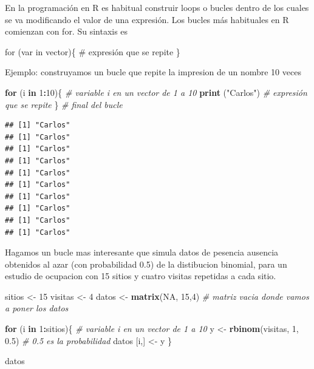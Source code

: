 \documentclass[
]{book}
\newenvironment{Shaded}{\begin{snugshade}}{\end{snugshade}}
\newcommand{\CommentTok}[1]{\textcolor[rgb]{0.56,0.35,0.01}{\textit{#1}}}
\newcommand{\ControlFlowTok}[1]{\textcolor[rgb]{0.13,0.29,0.53}{\textbf{#1}}}
\newcommand{\DecValTok}[1]{\textcolor[rgb]{0.00,0.00,0.81}{#1}}
\newcommand{\FloatTok}[1]{\textcolor[rgb]{0.00,0.00,0.81}{#1}}
\newcommand{\KeywordTok}[1]{\textcolor[rgb]{0.13,0.29,0.53}{\textbf{#1}}}
\newcommand{\NormalTok}[1]{#1}
\newcommand{\OperatorTok}[1]{\textcolor[rgb]{0.81,0.36,0.00}{\textbf{#1}}}
\newcommand{\OtherTok}[1]{\textcolor[rgb]{0.56,0.35,0.01}{#1}}
\newcommand{\StringTok}[1]{\textcolor[rgb]{0.31,0.60,0.02}{#1}}
\begin{document}
En la programación en R es habitual construir loops o bucles dentro de los cuales se va modificando el valor de una expresión. Los bucles más habituales en R comienzan con for. Su sintaxis es

for (var in vector)\{
\# expresión que se repite
\}

Ejemplo: construyamos un bucle que repite la impresion de un nombre 10 veces

\begin{Shaded}
\begin{Highlighting}[]
\ControlFlowTok{for}\NormalTok{ (i }\ControlFlowTok{in} \DecValTok{1}\OperatorTok{:}\DecValTok{10}\NormalTok{)\{     }\CommentTok{# variable i en un vector de 1 a 10}
  \KeywordTok{print}\NormalTok{ (}\StringTok{"Carlos"}\NormalTok{)   }\CommentTok{# expresión que se repite}
\NormalTok{\}                    }\CommentTok{# final del bucle}
\end{Highlighting}
\end{Shaded}

\begin{verbatim}
## [1] "Carlos"
## [1] "Carlos"
## [1] "Carlos"
## [1] "Carlos"
## [1] "Carlos"
## [1] "Carlos"
## [1] "Carlos"
## [1] "Carlos"
## [1] "Carlos"
## [1] "Carlos"
\end{verbatim}

Hagamos un bucle mas interesante que simula datos de pesencia ausencia obtenidos al azar (con probabilidad 0.5) de la distibucion binomial, para un estudio de ocupacion con 15 sitios y cuatro visitas repetidas a cada sitio.

\begin{Shaded}
\begin{Highlighting}[]
\NormalTok{sitios  <-}\StringTok{ }\DecValTok{15}
\NormalTok{visitas <-}\StringTok{ }\DecValTok{4}
\NormalTok{datos <-}\StringTok{ }\KeywordTok{matrix}\NormalTok{(}\OtherTok{NA}\NormalTok{, }\DecValTok{15}\NormalTok{,}\DecValTok{4}\NormalTok{) }\CommentTok{# matriz vacia donde vamos a poner los datos}

\ControlFlowTok{for}\NormalTok{ (i }\ControlFlowTok{in} \DecValTok{1}\OperatorTok{:}\NormalTok{sitios)\{     }\CommentTok{# variable i en un vector de 1 a 10}
\NormalTok{  y <-}\StringTok{ }\KeywordTok{rbinom}\NormalTok{(visitas, }\DecValTok{1}\NormalTok{, }\FloatTok{0.5}\NormalTok{) }\CommentTok{# 0.5 es la probabilidad}
\NormalTok{  datos [i,] <-}\StringTok{ }\NormalTok{y}
\NormalTok{\}                    }

\NormalTok{datos}
\end{Highlighting}
\end{Shaded}
\end{document}
